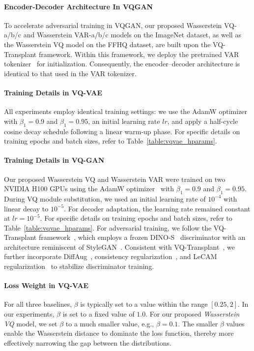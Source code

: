\paragraph{Encoder-Decoder Architecture In VQGAN} To accelerate adversarial training in VQGAN, our proposed Wasserstein VQ-a/b/c and Wasserstein VAR-a/b/c models on the ImageNet dataset, as well as the Wasserstein VQ model on the FFHQ dataset, are built upon the VQ-Transplant framework. Within this framework, we deploy the pretrained VAR tokenizer~\cite{Tian2024VisualAM} for initialization. Consequently, the encoder–decoder architecture is identical to that used in the VAR tokenizer.

\paragraph{Training Details in VQ-VAE} All experiments employ identical training settings: we use the AdamW optimizer~\cite{Loshchilov2017DecoupledWD} with $\beta_1=0.9$ and $\beta_1=0.95$, an initial learning rate $lr$, and apply a half-cycle cosine decay schedule following a linear warm-up phase. For specific details on training epochs and batch sizes, refer to Table~\ref{table:vqvae_hparams}.

\paragraph{Training Details in VQ-GAN} Our proposed Wasserstein VQ and Wasserstein VAR were trained on two NVIDIA H100 GPUs using the AdamW optimizer~\cite{Loshchilov2017DecoupledWD} with $\beta_1=0.9$ and $\beta_1=0.95$.
During VQ module substitution, we used an initial learning rate of $10^{-4}$ with linear decay to 
$10^{-5}$.
For decoder adaptation, the learning rate remained constant at $lr = 10^{-5}$. For specific details on training epochs and batch sizes, refer to Table~\ref{table:vqvae_hparams}. For adversarial training, we follow the VQ-Transplant framework~\cite{Fang2025VQTransplant}, which employs a frozen DINO-S~\cite{Caron2021EmergingPI,Oquab2023DINOv2LR} discriminator with an architecture reminiscent of StyleGAN~\cite{Karras2019AnalyzingAI,karras2019style}. Consistent with VQ-Transplant~\cite{Fang2025VQTransplant}, we further incorporate DiffAug~\cite{Zhao2020DifferentiableAF}, consistency regularization~\cite{Zhang2019ConsistencyRF}, and LeCAM regularization~\cite{Tseng2021RegularizingGA} to stabilize discriminator training.

\paragraph{Loss Weight in VQ-VAE} For all three baselines, $\beta$ is typically set to a value within the range $[0.25, 2]$. In our experiments, $\beta$ is set to a fixed value of $1.0$. For our proposed \emph{Wasserstein VQ} model, we set $\beta$ to a much smaller value,  e.g., $\beta=0.1$. The smaller $\beta$ values enable the Wasserstein distance to dominate the loss function, thereby more effectively narrowing the gap between the distributions.

